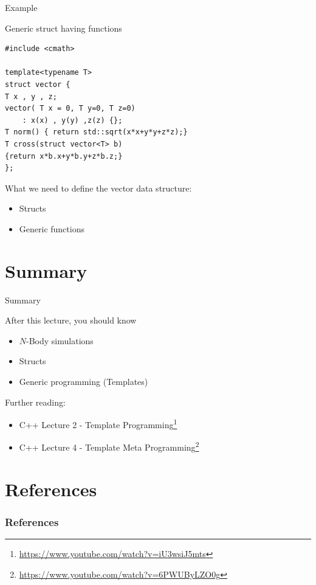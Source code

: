 \documentclass[\classoption]{beamer}
\begin{document}
\begin{frame}[fragile]{Example}
\begin{block}{Generic struct having functions}
\begin{lstlisting}
#include <cmath>

template<typename T>
struct vector {
T x , y , z;
vector( T x = 0, T y=0, T z=0)
	: x(x) , y(y) ,z(z) {};
T norm() { return std::sqrt(x*x+y*y+z*z);}
T cross(struct vector<T> b)
{return x*b.x+y*b.y+z*b.z;}
};
\end{lstlisting}
\end{block}

\begin{block}{What we need to define the vector data structure:}
\begin{itemize}
\item Structs
\item Generic functions
\end{itemize}
\end{block}

\end{frame}





\section{Summary}
\begin{frame}{Summary}
\begin{block}{After this lecture, you should know}
\begin{itemize}
\item $N$-Body simulations
\item Structs
\item Generic programming (Templates)
\end{itemize}
\end{block}

\begin{block}{Further reading:}
\begin{itemize}
\item C++ Lecture 2 - Template Programming\footnote{\tiny\url{https://www.youtube.com/watch?v=iU3wsiJ5mts}}
\item C++ Lecture 4 - Template Meta Programming\footnote{\tiny\url{https://www.youtube.com/watch?v=6PWUByLZO0g}}
\end{itemize}


\end{block}



\end{frame}



\section{References}

\begin{frame}[t, allowframebreaks]
\frametitle{References}


\end{frame}
\end{document}
